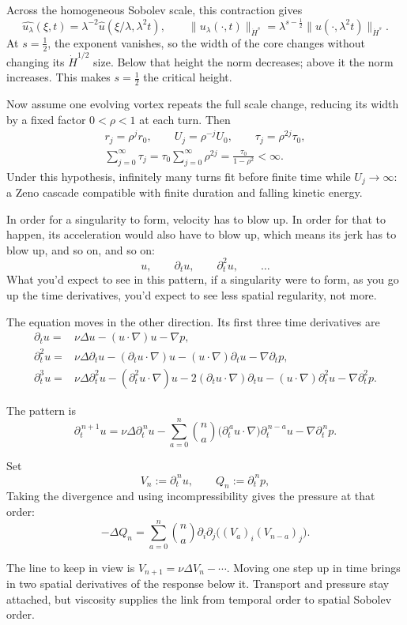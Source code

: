Across the homogeneous Sobolev scale, this contraction gives
\[
\widehat{u_\lambda}(\xi,t)
=\lambda^{-2}\widehat u(\xi/\lambda,\lambda^2t),
\qquad
\|u_\lambda(\cdot,t)\|_{\dot H^s}
=\lambda^{s-\frac12}\|u(\cdot,\lambda^2t)\|_{\dot H^s}.
\]
At \(s=\tfrac12\), the exponent vanishes, so the width of the core changes
without changing its \(\dot H^{1/2}\) size. Below that height the norm
decreases; above it the norm increases. This makes \(s=\tfrac12\) the critical
height.

Now assume one evolving vortex repeats the full scale change, reducing its
width by a fixed factor \(0<\rho<1\) at each turn. Then
\[
\begin{gathered}
r_j=\rho^jr_0,
\qquad U_j=\rho^{-j}U_0,
\qquad \tau_j=\rho^{2j}\tau_0,\\[3pt]
\displaystyle
\sum_{j=0}^{\infty}\tau_j
=\tau_0\sum_{j=0}^{\infty}\rho^{2j}
=\frac{\tau_0}{1-\rho^2}<\infty.
\end{gathered}
\]
Under this hypothesis, infinitely many turns fit before finite time while
\(U_j\to\infty\): a Zeno cascade compatible with finite duration and falling
kinetic energy.

\endgroup

In order for a singularity to form, velocity has to blow up. In order for
that to happen, its acceleration would also have to blow up, which means its
jerk has to blow up, and so on, and so on:
\[
u,\qquad \partial_tu,\qquad \partial_t^2u,\qquad \ldots
\]
What you'd expect to see in this pattern, if a singularity were to form, as
you go up the time derivatives, you'd expect to see less spatial regularity,
not more.

The equation moves in the other direction. Its first three time derivatives
are
\[
\begin{aligned}
\partial_tu
={}&\nu\Delta u
 -(u\!\cdot\nabla)u
 -\nabla p,\\[3pt]
\partial_t^2u
={}&\nu\Delta\partial_tu
 -(\partial_tu\!\cdot\nabla)u
 -(u\!\cdot\nabla)\partial_tu
 -\nabla\partial_tp,\\[3pt]
\partial_t^3u
={}&\nu\Delta\partial_t^2u
 -(\partial_t^2u\!\cdot\nabla)u
 -2(\partial_tu\!\cdot\nabla)\partial_tu
 -(u\!\cdot\nabla)\partial_t^2u
 -\nabla\partial_t^2p.
\end{aligned}
\]
\begin{samepage}
The pattern is
\[
\partial_t^{\,n+1}u
=\nu\Delta\partial_t^{\,n}u
-\sum_{a=0}^{n}\binom na
  \bigl(\partial_t^{\,a}u\!\cdot\nabla\bigr)
  \partial_t^{\,n-a}u
-\nabla\partial_t^{\,n}p.
\]
\end{samepage}
\begin{samepage}
Set
\[
V_n:=\partial_t^{\,n}u,
\qquad
Q_n:=\partial_t^{\,n}p,
\]
Taking the divergence and using incompressibility gives the pressure at that
order:
\[
-\Delta Q_n
=\sum_{a=0}^{n}\binom na
  \partial_i\partial_j
  \bigl((V_a)_i(V_{n-a})_j\bigr).
\]
\end{samepage}
The line to keep in view is \(V_{n+1}=\nu\Delta V_n-\cdots\). Moving one step
up in time brings in two spatial derivatives of the response below it.
Transport and pressure stay attached, but viscosity supplies the link from
temporal order to spatial Sobolev order.

